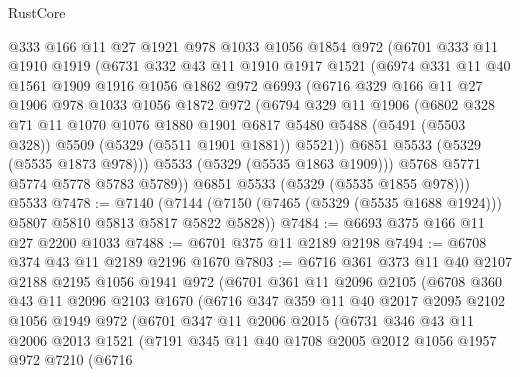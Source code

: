 \begin{lexlean}{RustCore}
\begin{coremodule}
      @333
      @166
      @11
      @27
      @1921
      @978
      @1033
      @1056
      @1854
      @972
      (@6701
        @333
        @11
        @1910
        @1919
        (@6731
          @332
          @43
          @11
          @1910
          @1917
          @1521
          (@6974
            @331
            @11
            @40
            @1561
            @1909
            @1916
            @1056
            @1862
            @972
            @6993
            (@6716
              @329
              @166
              @11
              @27
              @1906
              @978
              @1033
              @1056
              @1872
              @972
              (@6794
                @329
                @11
                @1906
                (@6802
                  @328
                  @71
                  @11
                  @1070
                  @1076
                  @1880
                  @1901
                  @6817
                  @5480
                  @5488
                  (@5491 (@5503 @328))
                  @5509
                  (@5329 (@5511 @1901 @1881))
                  @5521))
              @6851
              @5533
              (@5329 (@5535 @1873 @978)))
            @5533
            (@5329 (@5535 @1863 @1909)))
          @5768
          @5771
          @5774
          @5778
          @5783
          @5789))
      @6851
      @5533
      (@5329 (@5535 @1855 @978)))
    @5533
@7478 := @7140
    (@7144 (@7150 (@7465 (@5329 (@5535 @1688 @1924))) @5807 @5810 @5813 @5817 @5822 @5828))
@7484 := @6693 @375 @166 @11 @27 @2200 @1033
@7488 := @6701 @375 @11 @2189 @2198
@7494 := @6708 @374 @43 @11 @2189 @2196 @1670
@7803 := @6716
    @361
    @373
    @11
    @40
    @2107
    @2188
    @2195
    @1056
    @1941
    @972
    (@6701
      @361
      @11
      @2096
      @2105
      (@6708
        @360
        @43
        @11
        @2096
        @2103
        @1670
        (@6716
          @347
          @359
          @11
          @40
          @2017
          @2095
          @2102
          @1056
          @1949
          @972
          (@6701
            @347
            @11
            @2006
            @2015
            (@6731
              @346
              @43
              @11
              @2006
              @2013
              @1521
              (@7191
                @345
                @11
                @40
                @1708
                @2005
                @2012
                @1056
                @1957
                @972
                @7210
                (@6716

\end{coremodule}
\end{lexlean}
